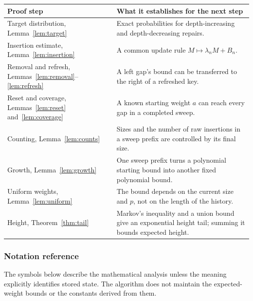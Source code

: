 \documentclass[11pt,a4paper]{article}
\theoremstyle{readable}
\begin{document}
\noindent\begin{minipage}{\linewidth}
\small
\renewcommand{\arraystretch}{1.2}
\begin{tabular}{@{}>{\raggedright\arraybackslash}p{.32\linewidth}
                  >{\raggedright\arraybackslash}p{.62\linewidth}@{}}
\toprule
Proof step & What it establishes for the next step \\
\midrule
Target distribution, Lemma~\ref{lem:target}
 & Exact probabilities for depth-increasing and depth-decreasing repairs. \\
Insertion estimate, Lemma~\ref{lem:insertion}
 & A common update rule $M\mapsto\lambda_nM+B_n$. \\
Removal and refresh, Lemmas~\ref{lem:removal}--\ref{lem:refresh}
 & A left gap's bound can be transferred to the right of a refreshed key. \\
Reset and coverage, Lemmas~\ref{lem:reset} and~\ref{lem:coverage}
 & A known starting weight $a$ can reach every gap in a completed sweep. \\
Counting, Lemma~\ref{lem:counts}
 & Sizes and the number of raw insertions in a sweep prefix are controlled by its final size. \\
Growth, Lemma~\ref{lem:growth}
 & One sweep prefix turns a polynomial starting bound into another fixed polynomial bound. \\
Uniform weights, Lemma~\ref{lem:uniform}
 & The bound depends on the current size and $p$, not on the length of the history. \\
Height, Theorem~\ref{thm:tail}
 & Markov's inequality and a union bound give an exponential height tail; summing it bounds expected height. \\
\bottomrule
\end{tabular}
\end{minipage}

\clearpage
\subsubsection*{Notation reference}
The symbols below describe the mathematical analysis unless the meaning
explicitly identifies stored state. The algorithm does not maintain
the expected-weight bounds or the constants derived from them.
\end{document}
